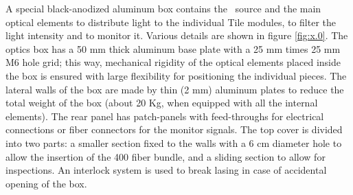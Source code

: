 A special black-anodized aluminum box contains the \laser~source and the main optical
elements to distribute light to the individual Tile modules, to filter the light
intensity and to monitor it. Various details are shown in figure \ref{fig:x.0}. The
optics box has a 50 mm thick aluminum base plate with a 25 mm times 25 mm M6 hole
grid; this way, mechanical rigidity of the optical elements 
placed inside the box is ensured with large flexibility for positioning the
individual pieces. The lateral walls of the box are made by thin (2 mm) aluminum
plates to
reduce the total weight of the box (about 20 Kg, when equipped with all the internal
elements). The rear panel has patch-panels with feed-throughs for electrical
connections or fiber connectors for the monitor signals. The top cover is divided
into two parts: a smaller section fixed to the walls with a 6 cm diameter hole to
allow the insertion of the 400 fiber bundle, and a sliding section to allow for
inspections.  An interlock system is used to break lasing in case of accidental
opening of the box. 
